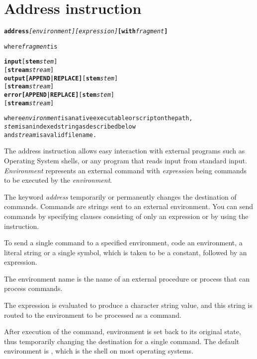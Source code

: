 \chapter{Address instruction}\label{refaddress}
\begin{shaded}
  \begin{alltt}
  \textbf{address} \emph{[environment]} \emph{[expression]} \textbf{[with} \emph{fragment}\textbf{]}

  where \emph{fragment} is
  
  \textbf{input} [\textbf{stem} \emph{stem}]
        [\textbf{stream} \emph{stream}]
	  \textbf{output} \textbf{[APPEND|REPLACE]} [\textbf{stem} \emph{stem}]
                          [\textbf{stream} \emph{stream}]
	  \textbf{error} \textbf{[APPEND|REPLACE]} [\textbf{stem} \emph{stem}]
                         [\textbf{stream} \emph{stream}]
                
where \emph{environment} is a native executable or script on the path,
\emph{stem} is an indexed string as described below
and \emph{stream} is a valid filename.
\end{alltt}

% 
\end{shaded}
The address instruction allows easy interaction with external programs such as Operating System shells, or any program that reads 
input from standard input. \emph{Environment} represents an external command with \emph{expression} being commands to be executed 
by the \emph{environment}. 

The keyword \emph{address} temporarily or permanently changes the destination of commands. Commands are strings sent to an external environment. You can send commands by specifying clauses consisting of only an expression or by using the  instruction.

To send a single command to a specified environment, code an
environment, a literal string or a single symbol, which is taken to be
a constant, followed by an expression.

The environment name is the
name of an external procedure or process that can process
commands.

The expression is evaluated to produce a character string
value, and this string is routed to the environment to be processed as
a command.

After execution of the command, environment is set back to
its original state, thus temporarily changing the destination for a
single command. The default environment is , which is the shell
on most operating systems.

